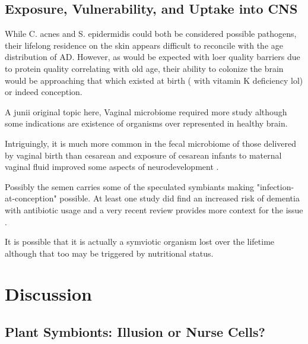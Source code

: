 \documentclass[aps,secnumarabic,balancelastpage,amsmath,amssymb,nofootinbib]{revtex4}
\begin{document}
\subsection{Exposure, Vulnerability, and Uptake into CNS }


While C. acnes and S. epidermidis could both
be considered possible pathogens, their lifelong
residence on the skin appears difficult to
reconcile with the age distribution of AD.
However, as would be expected with loer quality
barriers due to protein quality correlating
with old age, their ability to colonize
the brain would be approaching that
which existed at birth ( with vitamin K deficiency lol)
 or indeed conception.



A junii original topic here, 
Vaginal microbiome required more study although some
indications are existence of organisms over represented
in healthy brain. 

Intriguingly, it is much more common in the fecal microbiome of
those delivered by vaginal
birth than cesarean \cite{Pandey2012}
and exposure of cesarean infants to maternal vaginal fluid
improved some aspects of neurodevelopment 
\cite{Zhou_Qiu_Wang_Effects_vaginal_microbiota_2023}.



Possibly the semen carries some of the speculated symbiants
\cite{Koort_Sosa_Turk_Lactobacillus_crispatus_2023}
\cite{10.3389/fcimb.2022.815786}
making "infection-at-conception" possible. 
At least one study did find an increased risk of dementia with
antibiotic usage
\cite{10.3389/fphar.2022.888333}
and a very recent review provides more context for the issue
\cite{KarenMOttemann_2023}.

It is possible that it is actually a symviotic organism lost
over the lifetime although that too may be triggered by nutritional
status. 

\section{Discussion  }

\subsection{ Plant Symbionts: Illusion or Nurse Cells?  }
\end{document}
